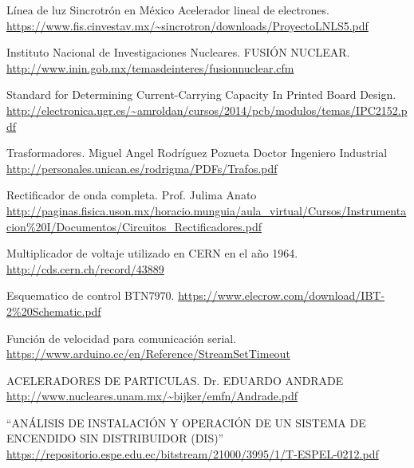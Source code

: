 \documentclass[twoside,22pt]{Latex/Classes/thesisUMSNH}
\begin{document}


\begin{thebibliography}{2}
   Línea de luz Sincrotrón en México
Acelerador lineal de electrones. \url{https://www.fis.cinvestav.mx/~sincrotron/downloads/ProyectoLNLS5.pdf}

Instituto Nacional de Investigaciones Nucleares. FUSIÓN NUCLEAR. \url{http://www.inin.gob.mx/temasdeinteres/fusionnuclear.cfm}

Standard for Determining Current-Carrying Capacity In Printed Board Design. \url{http://electronica.ugr.es/~amroldan/cursos/2014/pcb/modulos/temas/IPC2152.pdf}

Trasformadores. Miguel Angel Rodríguez Pozueta
Doctor Ingeniero Industrial \url{http://personales.unican.es/rodrigma/PDFs/Trafos.pdf}

Rectificador de onda completa. Prof. Julima Anato \url{http://paginas.fisica.uson.mx/horacio.munguia/aula_virtual/Cursos/Instrumentacion\%20I/Documentos/Circuitos_Rectificadores.pdf}

Multiplicador de voltaje utilizado en CERN en el año 1964. \url{http://cds.cern.ch/record/43889}

Esquematico de control BTN7970. \url{https://www.elecrow.com/download/IBT-2\%20Schematic.pdf}

Función de velocidad para comunicación serial. \url{https://www.arduino.cc/en/Reference/StreamSetTimeout}

ACELERADORES DE PARTICULAS. Dr. EDUARDO ANDRADE \url{http://www.nucleares.unam.mx/\~bijker/emfn/Andrade.pdf}

``ANÁLISIS DE INSTALACIÓN Y OPERACIÓN DE UN
SISTEMA DE ENCENDIDO SIN DISTRIBUIDOR (DIS)'' \url{https://repositorio.espe.edu.ec/bitstream/21000/3995/1/T-ESPEL-0212.pdf}


\end{thebibliography}
\end{document}

